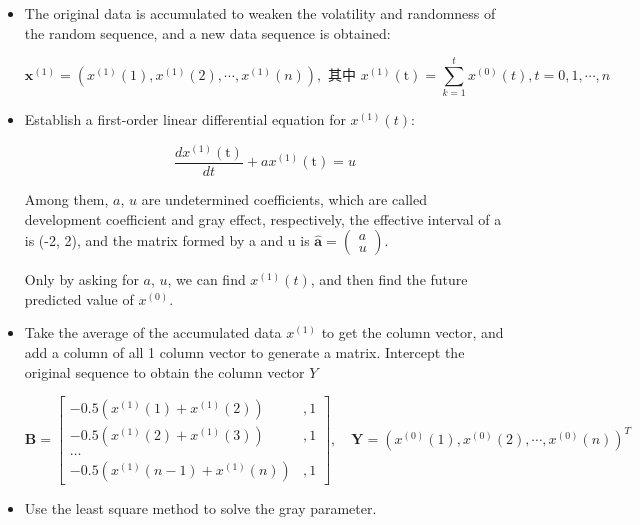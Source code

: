 \documentclass[12pt]{article}  %
\begin{document}
\begin{itemize}


\item  The original data is accumulated to weaken the volatility and randomness of the random sequence, and a new data sequence is obtained:

\begin{equation}\mathbf{x}^{(1)}=\left(x^{(1)}(1), x^{(1)}(2), \cdots, x^{(1)}(n)\right), \text { 其中 } x^{(1)}(\mathrm{t})=\sum_{k=1}^{t} x^{(0)}(t), t=0,1, \cdots, n\end{equation}

\item Establish a first-order linear differential equation for $x^{(1)}(t)$:

\begin{equation}\frac{d x^{(1)}(\mathrm{t})}{d t}+a x^{(1)}(\mathrm{t})=u\end{equation}

Among them, $a$, $u$ are undetermined coefficients, which are called development coefficient and gray effect, respectively, the effective interval of a is (-2, 2), and the matrix formed by a and u is  $\widehat{\mathbf{a}}=\left(\begin{array}{l}
a \\
u
\end{array}\right)$.

Only by asking for $a$, $u$, we can find $x^{(1)}(t)$, and then find the future predicted value of $x^{(0)}$.

\item Take the average of the accumulated data $x^{(1)}$ to get the column vector, and add a column of all 1 column vector to generate a matrix. Intercept the original sequence to obtain the column vector $Y$


\begin{equation}\label{eq:heat2}\mathbf{B}=\left[\begin{array}{cc}
-0.5\left(x^{(1)}(1)+x^{(1)}(2)\right) & , 1 \\
-0.5\left(x^{(1)}(2)+x^{(1)}(3)\right) & , 1 \\
\ldots & \\
-0.5\left(x^{(1)}(n-1)+x^{(1)}(n)\right) & , 1
\end{array}\right], \quad \mathbf{Y}=\left(x^{(0)}(1), x^{(0)}(2), \cdots, x^{(0)}(n)\right)^{T}\end{equation}

\item Use the least square method to solve the gray parameter. 


\end{itemize}
\end{document}
